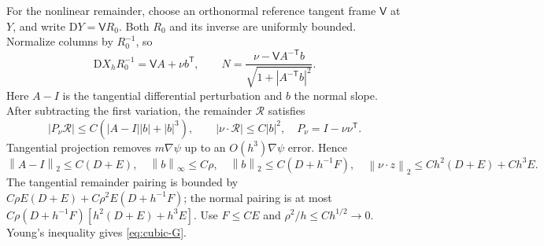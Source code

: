 \documentclass[11pt,a4paper]{article}
\numberwithin{equation}{section}
\theoremstyle{remark}
\newcommand{\norm}[1]{\left\lVert #1\right\rVert}
\begin{document}
For the nonlinear remainder, choose an orthonormal reference tangent
frame \(\mathsf V\) at \(Y\), and write \(\mathrm DY=\mathsf V R_0\).
Both \(R_0\) and its inverse are uniformly bounded. Normalize columns by
\(R_0^{-1}\), so
\[
 \mathrm DX_hR_0^{-1}=\mathsf V A+\nu b^{\mathsf T},\qquad
 N=\frac{\nu-\mathsf V A^{-\mathsf T}b}
                {\sqrt{1+|A^{-\mathsf T}b|^2}}.
\]
Here \(A-I\) is the tangential differential perturbation and \(b\)
the normal slope. After subtracting the first variation, the remainder
\(\mathcal R\) satisfies
\begin{equation}\label{eq:cubic-refined-remainder}
 |P_\nu\mathcal R|\leq C(|A-I||b|+|b|^3),\qquad
 |\nu\cdot\mathcal R|\leq C|b|^2,
 \quad P_\nu=I-\nu\nu^{\mathsf T}.
\end{equation}
Tangential projection removes \(m\nabla\psi\) up to an
\(O(h^3)\nabla\psi\) error. Hence
\[
 \norm{A-I}_2\leq C(D+E),\quad\norm b_\infty\leq C\rho,
 \quad\norm b_2\leq C(D+h^{-1}F),\quad
 \norm{\nu\cdot z}_2\leq Ch^2(D+E)+Ch^3E.
\]
The tangential remainder pairing is bounded by
\(C\rho E(D+E)+C\rho^2E(D+h^{-1}F)\); the normal pairing is at most
\(C\rho(D+h^{-1}F)[h^2(D+E)+h^3E]\).
Use \(F\leq CE\) and \(\rho^2/h\leq Ch^{1/2}\to0\).
Young's inequality gives \eqref{eq:cubic-G}.
\end{document}
